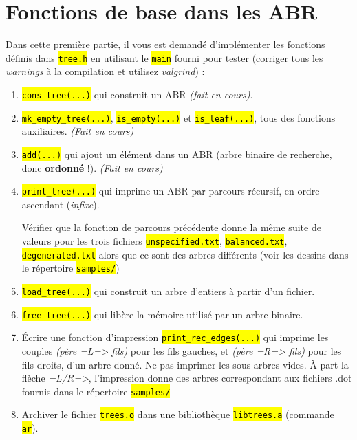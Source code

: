 \documentclass[final, a4paper, openbib, ]{article}
\let\OldTexttt\texttt
\renewcommand{\texttt}[1]{\OldTexttt{\hl{#1}}}
\begin{document}
\section{Fonctions de base dans les ABR}
Dans cette première partie, il vous est demandé d'implémenter les fonctions définis dans \texttt{tree.h} en utilisant le \texttt{main} fourni pour tester (corriger tous les \textit{warnings} à la compilation et utilisez \textit{valgrind}) :

\begin{enumerate}
	\item \texttt{cons_tree(...)} qui construit un ABR \textit{(fait en cours)}.
	
	\item \texttt{mk_empty_tree(...)}, \texttt{is_empty(...)} et \texttt{is_leaf(...)}, tous des fonctions auxiliaires. \textit{(Fait en cours)}
	
	\item \texttt{add(...)} qui ajout un élément dans un ABR (arbre binaire de recherche, donc \textbf{ordonné} !). \textit{(Fait en cours)}
	
	\item \texttt{print_tree(...)} qui imprime un ABR par parcours récursif, en ordre ascendant (\textit{infixe}).
	
	Vérifier que la fonction de parcours précédente donne la même suite de valeurs pour les trois fichiers \texttt{unspecified.txt}, \texttt{balanced.txt}, \texttt{degenerated.txt} alors que ce sont des arbres différents (voir les dessins dans le répertoire \texttt{samples/})
	
	\item \texttt{load_tree(...)} qui construit un arbre d'entiers à partir d'un fichier.
	\item \texttt{free_tree(...)} qui libère la mémoire utilisé par un arbre binaire.
	
	\item Écrire une fonction d'impression \texttt{print_rec_edges(...)} qui imprime les couples \textit{(père =L=> fils)} pour les fils gauches, et \textit{(père =R=> fils)} pour les fils droits, d'un arbre donné. Ne pas imprimer les sous-arbres vides.
	À part la flèche \textit{=L/R=>}, l'impression donne des arbres correspondant aux fichiers .dot fournis dans le répertoire \texttt{samples/}
	
	\item Archiver le fichier \texttt{trees.o} dans une bibliothèque \texttt{libtrees.a} (commande \texttt{ar}).
\end{enumerate}
\end{document}
